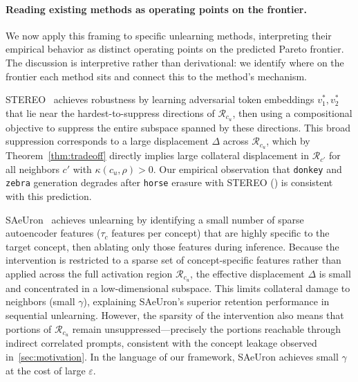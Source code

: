\paragraph{Reading existing methods as operating points on the frontier.}
We now apply this framing to specific unlearning methods, 
interpreting their empirical behavior as distinct operating points on the predicted Pareto frontier. The discussion is interpretive rather than derivational: we identify where on the frontier each method sits and connect this to the method's mechanism.
\begin{remark}
\label{rem:stereo}
STEREO~\citep{srivatsan2025stereo} achieves robustness by learning adversarial token embeddings $v_1^*, v_2^*$ that lie near the hardest-to-suppress directions of $\mathcal{R}_{c_u}$, then using a compositional objective to suppress the entire subspace spanned by these directions. This broad suppression corresponds to a large displacement $\Delta$ across $\mathcal{R}_{c_u}$, which by Theorem~\ref{thm:tradeoff} directly implies large collateral displacement in $\mathcal{R}_{c'}$ for all neighbors $c'$ with $\kappa(c_u,\rho) > 0$. Our empirical observation that \texttt{donkey} and \texttt{zebra} generation degrades after \texttt{horse} erasure with STEREO () is consistent with this prediction.
\end{remark}

\begin{remark}
\label{rem:saeuron}
SAeUron~\citep{cywinski2025saeuron} achieves unlearning by identifying a small number of sparse autoencoder features ($\tau_c$ features per concept) that are highly specific to the target concept, then ablating only those features during inference. Because the intervention is restricted to a sparse set of concept-specific features rather than applied across the full activation region $\mathcal{R}_{c_u}$, the effective displacement $\Delta$ is small and concentrated in a low-dimensional subspace. This limits collateral damage to neighbors (small $\gamma$), explaining SAeUron's superior retention performance in sequential unlearning. However, the sparsity of the intervention also means that portions of $\mathcal{R}_{c_u}$ remain unsuppressed---precisely the portions reachable through indirect correlated prompts, consistent with the concept leakage observed in~\cref{sec:motivation}. In the language of our framework, SAeUron achieves small $\gamma$ at the cost of large $\varepsilon$.
\end{remark}


